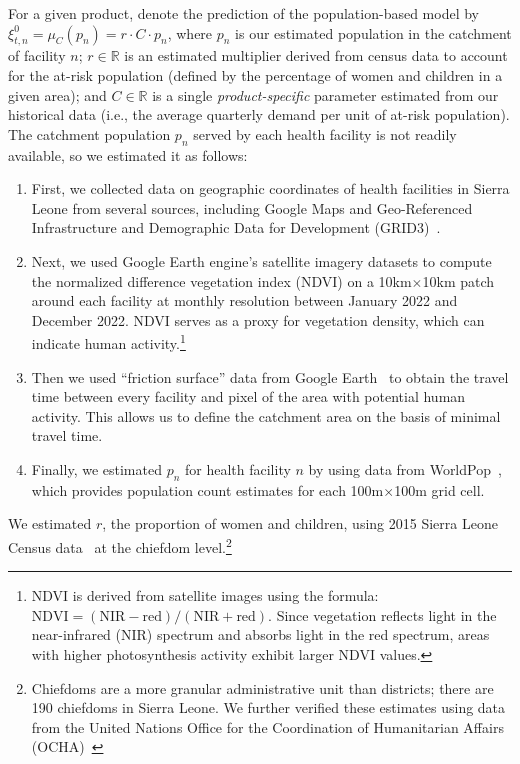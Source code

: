 \documentclass[12pt]{article}
\begin{document}
For a given product, denote the prediction of the population-based model by $\xi_{t,n}^0=\mu_C(p_n)=r\cdot C\cdot p_n$, where $p_n$ is our estimated population in the catchment of facility $n$; $r \in \mathbb{R}$ is an estimated multiplier derived from census data to account for the at-risk population (defined by the percentage of women and children in a given area); and $C\in\mathbb{R}$ is a single \textit{product-specific} parameter estimated from our historical data (i.e., the average quarterly demand per unit of at-risk population). The catchment population $p_n$ served by each health facility is not readily available, so we estimated it as follows:
\begin{enumerate}
\item{First, we collected data on geographic coordinates of health facilities in Sierra Leone from several sources, including Google Maps and Geo-Referenced Infrastructure and Demographic Data for Development (GRID3)~\cite{SierraLeoneMoHS_CIESIN_2023}.}
\item{Next, we used Google Earth engine’s satellite imagery datasets to compute the normalized difference vegetation index (NDVI) on a 10km$\times$10km patch around each facility at monthly resolution between January 2022 and December 2022. NDVI serves as a proxy for vegetation density, which can indicate human activity.\footnote{NDVI is derived from satellite images using the formula:
$\text{NDVI}=(\text{NIR} - \text{red}) / (\text{NIR} + \text{red})$. Since vegetation reflects light in the near-infrared (NIR) spectrum and absorbs light in the red spectrum, areas with higher photosynthesis activity exhibit larger NDVI values.
}}
\item{Then we used ``friction surface'' data from Google Earth~\cite{weiss2020global} to obtain the travel time between every facility and pixel of the area with potential human activity. This allows us to define the catchment area on the basis of minimal travel time.}
\item{Finally, we estimated $p_n$ for health facility $n$ by using data from WorldPop~\cite{WorldPopData}, which provides population count  estimates for each 100m$\times$100m grid cell.}
\end{enumerate}
We estimated $r$, the proportion of women and children, using 2015 Sierra Leone Census data~\cite{SLCensus2015} at the chiefdom level.\footnote{Chiefdoms are a more granular administrative unit than districts; there are 190 chiefdoms in Sierra Leone. We further verified these estimates using data from the United Nations Office for the Coordination of Humanitarian Affairs (OCHA)~\cite{HDX_HAPI_Population}}
\end{document}
